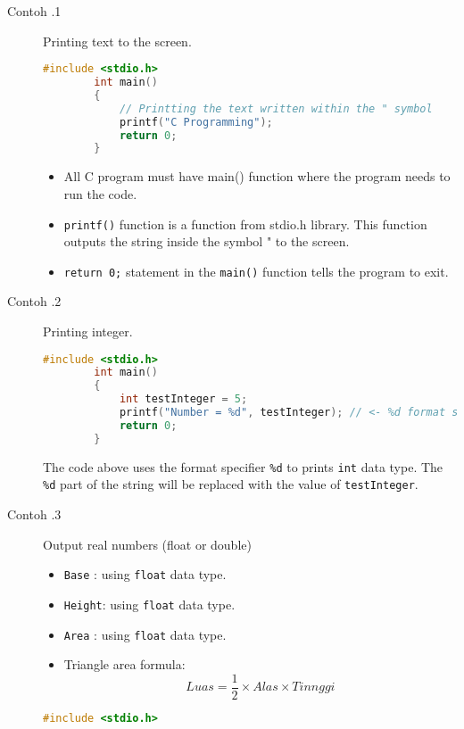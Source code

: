 \begin{description}
	\item[Contoh \thesection.1]  Printing text to the screen.
	\begin{lstlisting}[language=c,caption = Mencetak Tulisan "Pemprograman C Ke layar,captionpos=t]
		#include <stdio.h>    
		int main()
		{ 
			// Printting the text written within the " symbol
			printf("C Programming");
			return 0;
		}
	\end{lstlisting}
	\begin{itemize}
		\item All C program must have main() function where the program needs to run the code.
		\item \verb*|printf()| function is a function from stdio.h library. This function outputs the string inside the symbol " to the screen.
		\item \verb*|return 0;| statement in the \verb*|main()| function tells the program to exit.
	\end{itemize}
	\item [Contoh \thesection.2] Printing integer. 
	\begin{lstlisting}[language=c,captionpos=t]
		#include <stdio.h>
		int main()
		{
			int testInteger = 5;
			printf("Number = %d", testInteger); // <- %d format string
			return 0;
		}
	\end{lstlisting}
	
	
	The code above uses the format specifier \verb*|%d| to prints \verb*|int| data type. The \verb*|%d| part of the string will be replaced with the value of \verb*|testInteger|.

	\item[Contoh \thesection.3] Output real numbers (float or double)
	\begin{itemize}\label{eq:LuasSegitiga}
		\item \verb|Base|  : using \verb|float| data type.
		\item \verb|Height|: using \verb|float| data type.
		\item \verb|Area|  : using \verb|float| data type.
		\item Triangle area formula: 
		\begin{equation}
			Luas = \frac{1}{2} \times Alas \times Tinnggi
		\end{equation}
	\end{itemize}
	\begin{lstlisting}[language=c,captionpos=t]
		#include <stdio.h>
		

\end{lstlisting}
\end{description}
